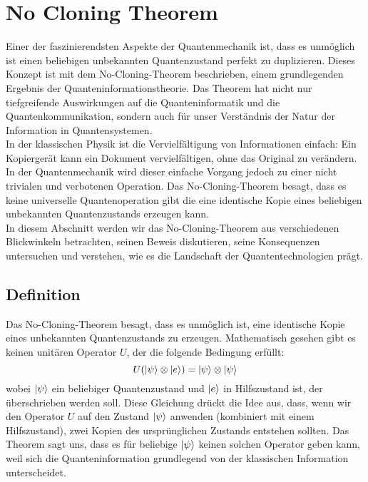 \section{No Cloning Theorem} \label{sec:no-cloning}

Einer der faszinierendsten Aspekte der Quantenmechanik ist, dass es unmöglich ist
einen beliebigen unbekannten Quantenzustand perfekt zu duplizieren.
Dieses Konzept ist mit dem No-Cloning-Theorem beschrieben, einem grundlegenden Ergebnis der Quanteninformationstheorie.
Das Theorem hat nicht nur tiefgreifende Auswirkungen auf die Quanteninformatik und die Quantenkommunikation,
sondern auch für unser Verständnis der Natur der Information in Quantensystemen.\\

In der klassischen Physik ist die Vervielfältigung von Informationen einfach:
Ein Kopiergerät kann ein Dokument vervielfältigen, ohne das Original zu verändern.
In der Quantenmechanik wird dieser einfache Vorgang jedoch zu einer nicht trivialen und verbotenen Operation.
Das No-Cloning-Theorem besagt, dass es keine universelle Quantenoperation gibt
die eine identische Kopie eines beliebigen unbekannten Quantenzustands erzeugen kann.\\

In diesem Abschnitt werden wir das No-Cloning-Theorem aus verschiedenen Blickwinkeln betrachten, seinen Beweis diskutieren,
seine Konsequenzen untersuchen und verstehen, wie es die Landschaft der Quantentechnologien prägt.

\subsection{Definition}\label{subsec:definition}
Das No-Cloning-Theorem besagt, dass es unmöglich ist, eine identische Kopie eines unbekannten Quantenzustands zu erzeugen.
Mathematisch gesehen gibt es keinen unitären Operator $U$, der die folgende Bedingung erfüllt:
\begin{equation}
    U(\ket{\psi}\otimes\ket{e})=\ket{\psi}\otimes\ket{\psi}\label {eq:cloning_assertion}
\end{equation}
wobei $\ket{\psi}$ ein beliebiger Quantenzustand und $\ket{e}$ in Hilfszustand ist, der überschrieben werden soll.
Diese Gleichung drückt die Idee aus, dass, wenn wir den Operator $U$ auf den Zustand $\ket{\psi}$ anwenden
(kombiniert mit einem Hilfszustand), zwei Kopien des ursprünglichen Zustands entstehen sollten.
Das Theorem sagt uns, dass es für beliebige $\ket{\psi}$ keinen solchen Operator geben kann,
weil sich die Quanteninformation grundlegend von der klassischen Information unterscheidet.
